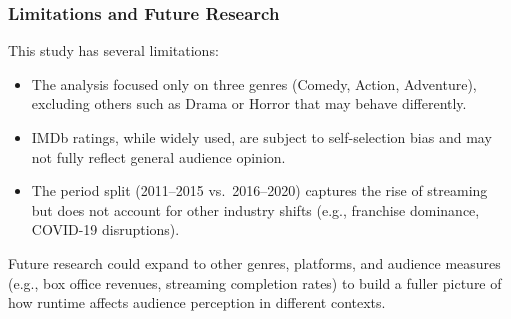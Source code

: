 \documentclass[
]{article}
\providecommand{\tightlist}{%
  \setlength{\itemsep}{0pt}\setlength{\parskip}{0pt}}
\begin{document}
\subsubsection{Limitations and Future
Research}\label{limitations-and-future-research}

This study has several limitations:

\begin{itemize}
\tightlist
\item
  The analysis focused only on three genres (Comedy, Action, Adventure),
  excluding others such as Drama or Horror that may behave
  differently.\\
\item
  IMDb ratings, while widely used, are subject to self-selection bias
  and may not fully reflect general audience opinion.\\
\item
  The period split (2011--2015 vs.~2016--2020) captures the rise of
  streaming but does not account for other industry shifts (e.g.,
  franchise dominance, COVID-19 disruptions).
\end{itemize}

Future research could expand to other genres, platforms, and audience
measures (e.g., box office revenues, streaming completion rates) to
build a fuller picture of how runtime affects audience perception in
different contexts.
\end{document}
